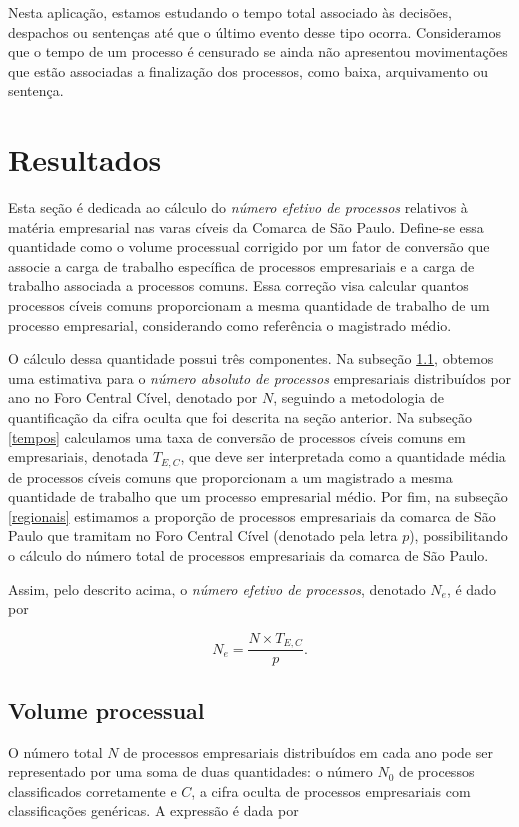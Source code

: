 \documentclass[]{book}
\begin{document}
Nesta aplicação, estamos estudando o tempo total associado às decisões,
despachos ou sentenças até que o último evento desse tipo ocorra.
Consideramos que o tempo de um processo é censurado se ainda não
apresentou movimentações que estão associadas a finalização dos
processos, como baixa, arquivamento ou sentença.

\chapter{Resultados}\label{resultados}

Esta seção é dedicada ao cálculo do \emph{número efetivo de processos}
relativos à matéria empresarial nas varas cíveis da Comarca de São
Paulo. Define-se essa quantidade como o volume processual corrigido por
um fator de conversão que associe a carga de trabalho específica de
processos empresariais e a carga de trabalho associada a processos
comuns. Essa correção visa calcular quantos processos cíveis comuns
proporcionam a mesma quantidade de trabalho de um processo empresarial,
considerando como referência o magistrado médio.

O cálculo dessa quantidade possui três componentes. Na subseção
\ref{identificacao}, obtemos uma estimativa para o \emph{número absoluto
de processos} empresariais distribuídos por ano no Foro Central Cível,
denotado por \(N\), seguindo a metodologia de quantificação da cifra
oculta que foi descrita na seção anterior. Na subseção \ref{tempos}
calculamos uma taxa de conversão de processos cíveis comuns em
empresariais, denotada \(T_{E,C}\), que deve ser interpretada como a
quantidade média de processos cíveis comuns que proporcionam a um
magistrado a mesma quantidade de trabalho que um processo empresarial
médio. Por fim, na subseção \ref{regionais} estimamos a proporção de
processos empresariais da comarca de São Paulo que tramitam no Foro
Central Cível (denotado pela letra \(p\)), possibilitando o cálculo do
número total de processos empresariais da comarca de São Paulo.

Assim, pelo descrito acima, o \emph{número efetivo de processos},
denotado \(N_e\), é dado por

\[ 
N_e = \frac{N \times T_{E,C}}{p} .
\]

\section{Volume processual}\label{identificacao}

O número total \(N\) de processos empresariais distribuídos em cada ano
pode ser representado por uma soma de duas quantidades: o número \(N_0\)
de processos classificados corretamente e \(C\), a cifra oculta de
processos empresariais com classificações genéricas. A expressão é dada
por
\end{document}
